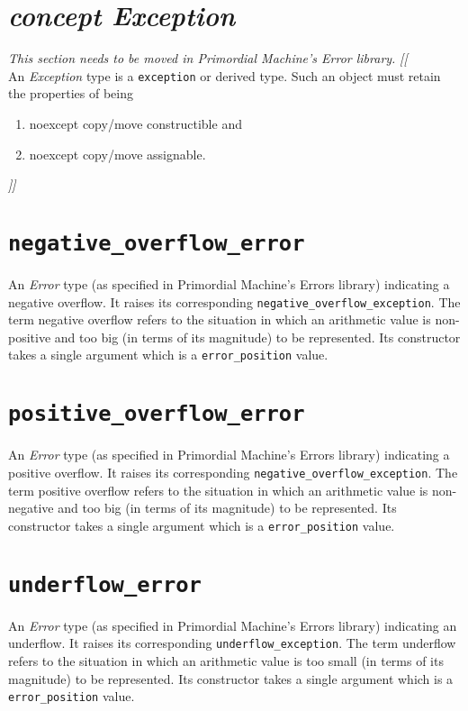 \documentclass[oneside]{report}
\begin{document}
\section{\textit{concept Exception}}
\textit{\color{orange}This section needs to be moved in Primordial Machine's Error library.}
\noindent\textit{\color{orange}[[}\\
An \textit{Exception} type is a \texttt{exception} or derived type.
Such an object must retain the properties of being
\begin{enumerate}
  \item noexcept copy/move constructible and
  \item noexcept copy/move assignable.
\end{enumerate}
\noindent\textit{\color{orange}]]}

\section{\texttt{negative\_overflow\_error}}
An \textit{Error} type (as specified in Primordial Machine's Errors library) indicating a negative overflow.
It raises its corresponding \texttt{negative\_overflow\_exception}.
The term negative overflow refers to the situation in which an arithmetic value is non-positive and
too big (in terms of its magnitude) to be represented. Its constructor takes a single argument which
is a \texttt{error\_position} value.

\section{\texttt{positive\_overflow\_error}}
An \textit{Error} type (as specified in Primordial Machine's Errors library) indicating a positive overflow.
It raises its corresponding \texttt{negative\_overflow\_exception}.
The term positive overflow refers to the situation in which an arithmetic value is non-negative and
too big (in terms of its magnitude) to be represented. Its constructor takes a single argument which
is a \texttt{error\_position} value.

\section{\texttt{underflow\_error}}
An \textit{Error} type (as specified in Primordial Machine's Errors library) indicating an underflow.
It raises its corresponding \texttt{underflow\_exception}.
The term underflow refers to the situation in which an arithmetic value is too small (in terms of
its magnitude) to be represented. Its constructor takes a single argument which
is a \texttt{error\_position} value.
\end{document}

